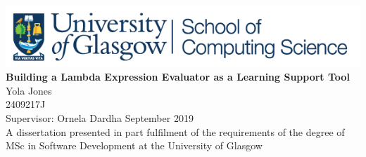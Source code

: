 \documentclass[a4paper,11pt]{report}
\begin{document}
\begin{titlepage}
	\centering
	\includegraphics[scale=0.9]{images/cslogo.png} %
	\vfill
	{\bfseries\Huge
		Building a Lambda Expression Evaluator as a Learning Support Tool\\
	}
	\vskip2cm
	{\huge
		Yola Jones\\
	}
	{\LARGE
		\vskip0.5cm
		2409217J\\
		\vskip0.75cm
		Supervisor: Ornela Dardha
	}
	\vskip2cm
	{\Large
		September 2019\\
		\vskip1cm
		A dissertation presented in part fulfilment of the requirements of the degree of MSc in Software Development at the University of Glasgow
	}  
	\vfill
	
	
\end{titlepage}
\thispagestyle{empty}
\begin{abstract}
This dissertation describes the design, implementation and evaluation of a lambda calculus expression evaluator built using ANTLR and contained within a web interface, designed as support material for the Theory of Computation course at the University of Glasgow. This dissertation discusses in detail the relevant sections of lambda calculus as covered on the course, then discusses the process of using Abstract Syntax Trees to examine the structure of a term based on a particular syntax, which can then be used to parse and evaluate input expressions. The approach taken to evaluation using ANTLR has also been discussed in detail, before giving a summary of testing done and evidence to support the statement that the goals of the project have been met.
\end{abstract}
\newpage
{}
\tableofcontents
\newpage


%
%
\renewcommand{\cleardoublepage}{}
\renewcommand{\clearpage}{}
\setcounter{page}{1}
\end{document}
